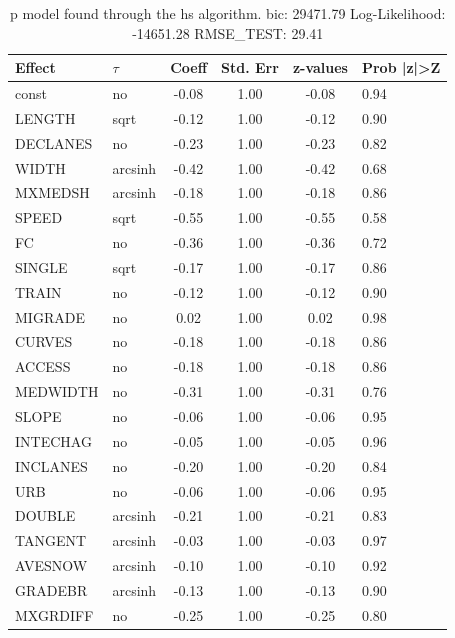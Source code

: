 \begin{table}
	\caption{p model found through the hs algorithm. bic: 29471.79 Log-Likelihood: -14651.28 RMSE_TEST: 29.41}
	\begin{center}
		\begin{tabular}{|l|l|c|c|c|l|}
			\hline
			Effect & $\tau$ & Coeff & Std. Err & z-values & Prob |z|>Z \\
			\hline
			const & no & -0.08 & 1.00 & -0.08 & 0.94 \\
			\hline
			LENGTH & sqrt & -0.12 & 1.00 & -0.12 & 0.90 \\
			\hline
			DECLANES & no & -0.23 & 1.00 & -0.23 & 0.82 \\
			\hline
			WIDTH & arcsinh & -0.42 & 1.00 & -0.42 & 0.68 \\
			\hline
			MXMEDSH & arcsinh & -0.18 & 1.00 & -0.18 & 0.86 \\
			\hline
			SPEED & sqrt & -0.55 & 1.00 & -0.55 & 0.58 \\
			\hline
			FC & no & -0.36 & 1.00 & -0.36 & 0.72 \\
			\hline
			SINGLE & sqrt & -0.17 & 1.00 & -0.17 & 0.86 \\
			\hline
			TRAIN & no & -0.12 & 1.00 & -0.12 & 0.90 \\
			\hline
			MIGRADE & no & 0.02 & 1.00 & 0.02 & 0.98 \\
			\hline
			CURVES & no & -0.18 & 1.00 & -0.18 & 0.86 \\
			\hline
			ACCESS & no & -0.18 & 1.00 & -0.18 & 0.86 \\
			\hline
			MEDWIDTH & no & -0.31 & 1.00 & -0.31 & 0.76 \\
			\hline
			SLOPE & no & -0.06 & 1.00 & -0.06 & 0.95 \\
			\hline
			INTECHAG & no & -0.05 & 1.00 & -0.05 & 0.96 \\
			\hline
			INCLANES & no & -0.20 & 1.00 & -0.20 & 0.84 \\
			\hline
			URB & no & -0.06 & 1.00 & -0.06 & 0.95 \\
			\hline
			DOUBLE & arcsinh & -0.21 & 1.00 & -0.21 & 0.83 \\
			\hline
			TANGENT & arcsinh & -0.03 & 1.00 & -0.03 & 0.97 \\
			\hline
			AVESNOW & arcsinh & -0.10 & 1.00 & -0.10 & 0.92 \\
			\hline
			GRADEBR & arcsinh & -0.13 & 1.00 & -0.13 & 0.90 \\
			\hline
			MXGRDIFF & no & -0.25 & 1.00 & -0.25 & 0.80 \\
			\hline

\end{tabular}
\end{center}
\end{table}
